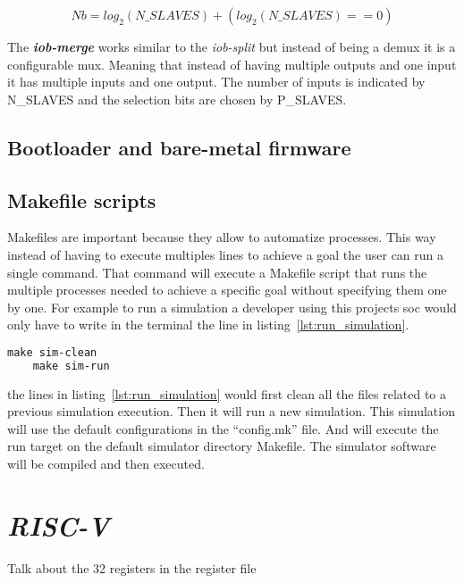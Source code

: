 \begin{equation}
    \label{eq:number_bits}
    Nb = log_2(N\_SLAVES)+(log_2(N\_SLAVES)==0)
\end{equation}

The \textbf{\textit{iob-merge}} works similar to the \textit{iob-split} but instead of being a \acrshort{demux} it is a configurable \acrfull{mux}. Meaning that instead of having multiple outputs and one input it has multiple inputs and one output. The number of inputs is indicated by N\_SLAVES and the selection bits are chosen by P\_SLAVES.

\subsection{Bootloader and bare-metal firmware}

\subsection{Makefile scripts}
Makefiles are important because they allow to automatize processes. This way instead of having to execute multiples lines to achieve a goal the user can run a single command. That command will execute a Makefile script that runs the multiple processes needed to achieve a specific goal without specifying them one by one.
For example to run a simulation a developer using this projects \acrshort{soc} would only have to write in the terminal the line in listing~\ref{lst:run_simulation}.

\begin{lstlisting}[language=make, caption={Run a simulation.}, label=lst:run_simulation]
    make sim-clean
    make sim-run
\end{lstlisting}

the lines in listing~\ref{lst:run_simulation} would first clean all the files related to a previous simulation execution. Then it will run a new simulation. This simulation will use the default configurations in the \enquote{config.mk} file. And will execute the run target on the default simulator directory Makefile. The simulator software will be compiled and then executed.

\section{\textit{RISC-V}}
\label{section:riscv}
Talk about the 32 registers in the register file

